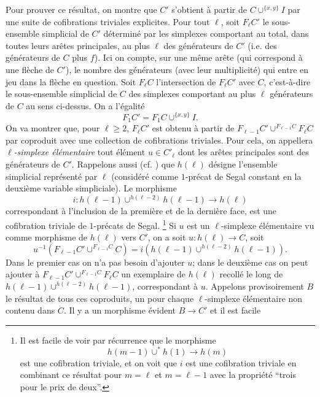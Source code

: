 \documentclass[12pt]{article}
\begin{document}
Pour prouver ce r\'esultat, on montre que $C'$
s'obtient \`a partir de $C\cup ^{\{ x,y\} } I$ par une suite de cofibrations
triviales explicites. Pour tout $\ell$, soit $F_{\ell}C'$ le sous-ensemble
simplicial de $C'$ d\'etermin\'e par les simplexes comportant au total,
dans toutes
leurs ar\^etes principales, au plus  $\ell$ des g\'en\'erateurs de $C'$ (i.e.
des g\'en\'erateurs de $C$ plus $f$). Ici on compte, sur une m\^eme ar\^ete (qui
correspond \`a une fl\`eche de $C'$), le nombre des g\'en\'erateurs (avec
leur multiplicit\'e) qui entre en jeu dans la fl\`eche en question. Soit
$F_{\ell}C$ l'intersection de $F_{\ell}C'$ avec $C$,  c'est-\`a-dire le
sous-ensemble simplicial de $C$ des simplexes comportant au plus
$\ell$ g\'en\'erateurs de $C$ au sens ci-dessus. On a l'\'egalit\'e
$$
F_1C' = F_1C \cup ^{\{ x,y\} } I.
$$
On va montrer que, pour $\ell \geq 2$, $F_{\ell}C'$ est obtenu  \`a partir de
$F_{\ell -1}C'\cup ^{F_{\ell -1}C}F_{\ell}C$ par coproduit avec une
collection de cofibrations triviales.  Pour cela,  on appellera {\em
$\ell$-simplexe
\'el\'ementaire} tout \'el\'ement  $u\in C'_{\ell}$ dont les ar\^etes
principales sont des g\'en\'erateurs de $C'$. Rappelons aussi (cf.
\cite{nCAT}) que $h(\ell )$ d\'esigne l'ensemble simplicial repr\'esent\'e
par $\ell$
(consid\'er\'e comme $1$-pr\'ecat de Segal constant en la deuxi\`eme variable
simpliciale).
Le morphisme
$$
i: h(\ell -1) \cup ^{h(\ell -2)}h(\ell -1)\rightarrow h(\ell )
$$
correspondant \`a l'inclusion de la premi\`ere et de la derni\`ere face, est une
cofibration triviale de $1$-pr\'ecats de Segal.
\footnote{
Il est facile de voir par r\'ecurrence que le morphisme
$$
h(m -1) \cup ^{\ast} h(1) \rightarrow h(m )
$$
est une cofibration triviale, et on voit que $i$ est une cofibration
triviale
en combinant ce r\'esultat pour $m=\ell$ et $m=\ell -1$
 avec la propri\'et\'e ``trois pour le prix de deux''.}
Si $u$ est un $\ell$-simplexe \'el\'ementaire vu comme
morphisme
de $h(\ell )$ vers $C'$, on a soit $u: h(\ell )\rightarrow C$, soit
$$
u^{-1} (F_{\ell -1}C' \cup ^{F_{\ell -1}C} C) =
i\left( h(\ell -1) \cup ^{h(\ell -2)}h(\ell -1)\right) .
$$
Dans le premier cas on n'a pas besoin d'ajouter $u$; dans le deuxi\`eme cas on
peut ajouter \`a $F_{\ell -1} C'\cup ^{F_{\ell -1}C} F_{\ell}C$ un exemplaire de
$h(\ell )$ recoll\'e le long de  $ h(\ell -1) \cup ^{h(\ell -2)}h(\ell -1)$,
correspondant \`a $u$. Appelons provisoirement $B$ le r\'esultat de tous ces
coproduits, un pour chaque $\ell$-simplexe \'el\'ementaire non contenu
dans $C$. Il y a un morphisme \'evident $B\rightarrow C'$ et il est facile
\end{document}
